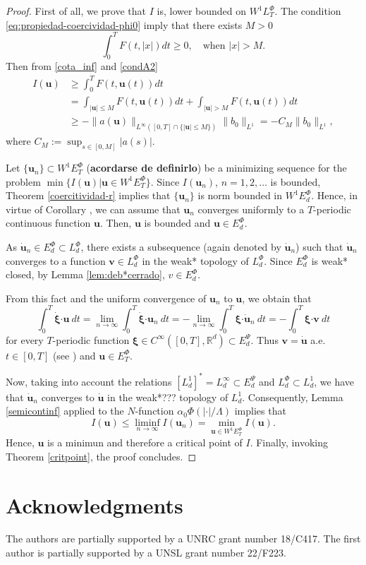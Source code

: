 \documentclass[twoside]{article}
\theoremstyle{remark}
\newcommand{\lphi}{L^{\Phi}}
\newcommand{\ephi}{E^{\Phi}}
\newcommand{\wphi}{W^{1}\lphi}
\newcommand{\wphiet}{W^{1}\ephi_T}
\newcommand{\wphie}{W^{1}\ephi}
\renewcommand{\b}[1]{\boldsymbol{#1}}
\newcommand{\rr}{\mathbb{R}}
\newcommand{\ccdot}{\b{\cdot}}
\renewcommand{\leq}{\leqslant}
\renewcommand{\geq}{\geqslant}
\newcommand{\epsi}{E^{\Psi}}
\begin{document}
\begin{proof} First of all, we prove that   $I$ is, lower bounded on $\wphi_T$.  The condition \eqref{eq:propiedad-coercividad-phi0} imply that there exists $M>0$ 
\[\int_0^TF(t,|x|)dt\geq 0,\quad\text{when } |x|> M.\]
Then from \eqref{cota_inf} and \eqref{condA2}
\[\begin{split}
I(\b{u})&\geq \int_0^T F(t,\b{u}(t))dt\\
&= \int_{|\b{u}|\leq M} F(t,\b{u}(t))dt + \int_{|\b{u}|>M} F(t,\b{u}(t))dt\\
&\geq -\|a(\b{u})\|_{L^{\infty}([0,T]\cap\{|\b{u}|\leq M\})}\|b_0\|_{L^1} =-C_M\|b_0\|_{L^1},
\end{split}
\]
where $C_M:=\sup_{s\in [0,M]}|a(s)|$. 





Let $\{\b{u}_n\}\subset \wphiet$ (\textbf{acordarse de definirlo}) be a  minimizing sequence for the problem  $\min\{I(\b{u})|\b{u}\in\wphiet\}$.
Since  $I(\b{u}_n)$, $n=1,2,\ldots$  is bounded, Theorem \ref{coercitividad-r}  implies that $\{\b{u}_n\}$ is norm bounded in $\wphie_d$. Hence, in virtue of Corollary \cite[Corollary 2.2]{ABGMS2015}, we can assume that $\b{u}_n$ converges uniformly to a $T$-periodic continuous function $\b{u}$.  
Then, $\b{u}$ is bounded and $\b{u} \in \ephi_d$. 

As $\b{\dot{u}}_n \in \ephi_d\subset \lphi_d$, 
there exists a subsequence (again denoted by $\b{\dot{u}}_n$) such that $\b{\dot{u}}_n$ converges to a function $\b{v}\in\lphi_d$ in the weak* topology of $\lphi_d$. 
Since $\ephi_d$ is weak* closed, by Lemma \ref{lem:deb*cerrado}, $v\in \ephi_d$.

From this fact and the uniform convergence of $\b{u}_n$ to $\b{u}$, we obtain that
\[
\int_0^T\b{\dot{\xi}}\ccdot\b{u}\ dt=\lim_{n\to\infty}\int_0^T\b{\dot{\xi}}\ccdot\b{u}_n \ dt=-\lim_{n\to\infty}\int_0^T\b{\xi}\ccdot\b{\dot{u}}_n\ dt=-\int_0^T\b{\xi}\ccdot\b{v}\ dt
\]
for every $T$-periodic function $\b{\xi}\in C^{\infty}([0,T],\rr^d)\subset\epsi_d$.
Thus $\b{v}=\b{\dot{u}}$ a.e. $t\in [0,T]$ (see \cite[p. 6]{mawhin2010critical}) and $\b{u}\in\ephi_T$.

Now, taking into account the relations $\left[L^1_d\right]^*=L^{\infty}_d\subset  \epsi_d$ and $\lphi_d\subset L^1_d$, we have that $\b{\dot{u}}_n$ converges to $\b{\dot{u}}$ in the weak*??? topology of $L^1_d$. Consequently,  Lemma \ref{semicontinf} applied to the $N$-function $\alpha_0\Phi\left(|\ccdot|/\Lambda\right)$ implies that
\[I(\b{u})\leq  \liminf_{n\to\infty}I(\b{u}_n)=\min\limits_{\b{u}\in\wphie_T}I(\b{u}).\]
Hence, $\b{u}$ is a minimun and therefore a critical point of $I$. Finally, 
invoking Theorem \ref{critpoint},  the proof concludes.\end{proof}





\section*{Acknowledgments}
The authors are partially supported by a UNRC grant number 18/C417. The first author is  partially supported by a  UNSL grant number 22/F223. 


  
 
\end{document}
